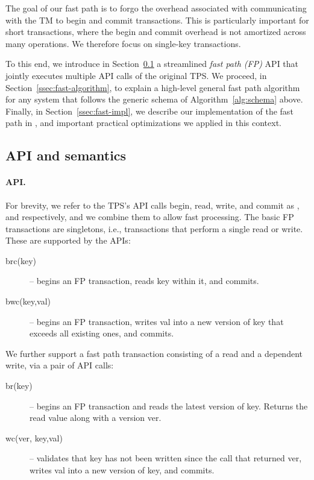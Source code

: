 
The goal of our fast path is to forgo the overhead associated with 
communicating with 
the TM to begin and commit transactions. This is particularly important for short transactions, where the begin and commit overhead is not amortized
across many operations.
We therefore focus on single-key transactions.

To this end, we introduce in Section~\ref{ssec:fast-api} a streamlined  \emph{fast path (FP)}
API that jointly executes multiple API calls of the original TPS.
We proceed, in Section~\ref{ssec:fast-algorithm}, to explain a high-level general fast path algorithm 
{for any system that follows the generic schema of  Algorithm~\ref{alg:schema} above}. 
Finally, in Section~\ref{ssec:fast-impl}, we describe our implementation of the fast path in \sys, and 
important practical optimizations we applied in this context.
 

\subsection{API and semantics}
\label{ssec:fast-api}

\paragraph{API.}
For brevity, we refer to the TPS's API calls  begin, read, write, and commit as , and  respectively, and 
we combine them to allow fast processing.
The basic FP transactions are singletons, i.e., transactions that perform a single
read or write. These are supported by the APIs: 
\begin{description}
\item[brc(key)] -- begins an FP transaction, reads key within it, and commits.
\item[bwc(key,val)] -- begins an FP transaction,  writes val into a new version of key that exceeds all existing ones, and commits.
\end{description}

We further support a fast path transaction consisting of a read and a dependent write, via a pair of API calls:
\begin{description}
\item[br(key)] -- begins an FP transaction and  reads the latest version of key. 
Returns the read value along with a version ver.
\item[wc(ver, key,val)] -- 	validates that key has not been written since the   call that returned ver, writes val into a new version of key, and commits.
\end{description}

